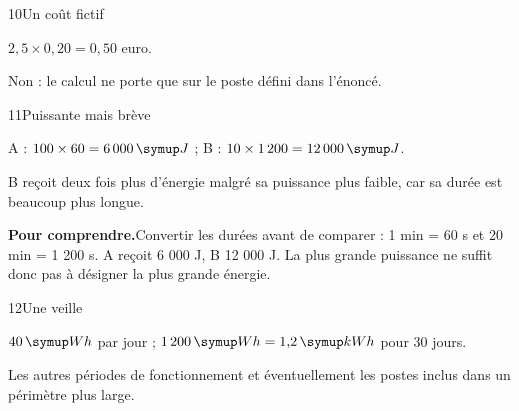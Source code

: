 \par\noindent\begin{minipage}{\linewidth}
\begin{corrige}{10}{Un coût fictif}
\begin{questions}
\item $2{,}5\times0{,}20=0{,}50$ euro.
\item Non : le calcul ne porte que sur le poste défini dans l’énoncé.
\end{questions}
\end{corrige}
\end{minipage}
\par\noindent\begin{minipage}{\linewidth}
\begin{corrige}{11}{Puissante mais brève}
\begin{questions}
\item A : $100\times60=6\,000\unite J$ ; B : $10\times1\,200=12\,000\unite J$.
\item B reçoit deux fois plus d’énergie malgré sa puissance plus faible, car sa durée est beaucoup plus longue.
\end{questions}
\par\smallskip\noindent\textbf{Pour comprendre.}\enspace Convertir les durées avant de comparer : 1 min = 60 s et 20 min = 1 200 s. A reçoit 6 000 J, B 12 000 J. La plus grande puissance ne suffit donc pas à désigner la plus grande énergie.\par
{}
\end{corrige}
\end{minipage}
\par\noindent\begin{minipage}{\linewidth}
\begin{corrige}{12}{Une veille}
\begin{questions}
\item $40\unite{Wh}$ par jour ; $1\,200\unite{Wh}=1{,}2\unite{kWh}$ pour 30 jours.
\item Les autres périodes de fonctionnement et éventuellement les postes inclus dans un périmètre plus large.
\end{questions}
\end{corrige}
\end{minipage}
